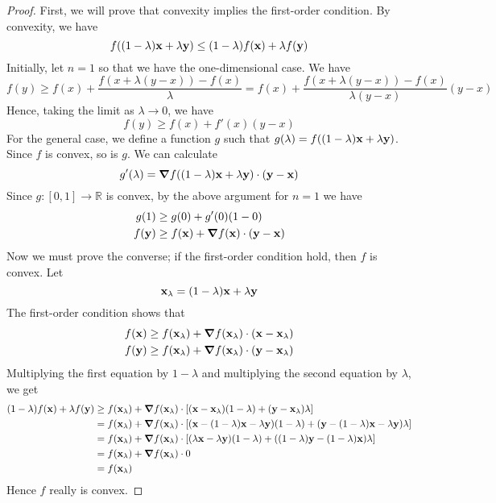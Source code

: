 \begin{proof}
	First, we will prove that convexity implies the first-order condition.
	By convexity, we have
	\[
		f\qty((1-\lambda)\vb x + \lambda \vb y) \leq (1-\lambda)f(\vb x) + \lambda f(\vb y)
	\]
	Initially, let \(n=1\) so that we have the one-dimensional case.
	We have
	\[
		f(y) \geq f(x) + \frac{f(x + \lambda(y-x)) - f(x)}{\lambda} = f(x) + \frac{f(x + \lambda(y-x)) - f(x)}{\lambda(y-x)}(y-x)
	\]
	Hence, taking the limit as \(\lambda \to 0\), we have
	\[
		f(y) \geq f(x) + f'(x)(y-x)
	\]
	For the general case, we define a function \(g\) such that \(g(\lambda) = f((1-\lambda)\vb x + \lambda\vb y)\).
	Since \(f\) is convex, so is \(g\).
	We can calculate
	\[
		g'(\lambda) = \grad{f((1-\lambda)\vb x + \lambda\vb y)} \cdot (\vb y - \vb x)
	\]
	Since \(g \colon [0, 1] \to \mathbb R\) is convex, by the above argument for \(n = 1\) we have
	\begin{align*}
		g(1)     & \geq g(0) + g'(0) (1-0)                               \\
		f(\vb y) & \geq f(\vb x) + \grad{f(\vb x)} \cdot (\vb y - \vb x)
	\end{align*}
	Now we must prove the converse; if the first-order condition hold, then \(f\) is convex.
	Let
	\[
		\vb x_\lambda = (1-\lambda)\vb x + \lambda \vb y
	\]
	The first-order condition shows that
	\begin{align*}
		f(\vb x) & \geq f(\vb x_\lambda) + \grad{f(\vb x_\lambda)} \cdot (\vb x - \vb x_\lambda) \\
		f(\vb y) & \geq f(\vb x_\lambda) + \grad{f(\vb x_\lambda)} \cdot (\vb y - \vb x_\lambda)
	\end{align*}
	Multiplying the first equation by \(1-\lambda\) and multiplying the second equation by \(\lambda\), we get
	\begin{align*}
		(1-\lambda)f(\vb x) + \lambda f(\vb y) & \geq f(\vb x_\lambda) + \grad{f(\vb x_\lambda)} \cdot \qty[(\vb x - \vb x_\lambda)(1-\lambda) + (\vb y - \vb x_\lambda)\lambda]                                    \\
		                                       & = f(\vb x_\lambda) + \grad{f(\vb x_\lambda)} \cdot \qty[(\vb x - (1-\lambda)\vb x - \lambda \vb y)(1-\lambda) + (\vb y - (1-\lambda)\vb x - \lambda \vb y)\lambda] \\
		                                       & = f(\vb x_\lambda) + \grad{f(\vb x_\lambda)} \cdot \qty[(\lambda \vb x - \lambda \vb y)(1-\lambda) + ((1-\lambda)\vb y - (1-\lambda) \vb x)\lambda]                \\
		                                       & = f(\vb x_\lambda) + \grad{f(\vb x_\lambda)} \cdot 0                                                                                                               \\
		                                       & = f(\vb x_\lambda)
	\end{align*}
	Hence \(f\) really is convex.
\end{proof}

